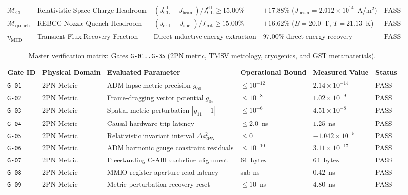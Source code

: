 \documentclass[11pt,onecolumn]{article}
\begin{document}
\begin{table}[!htbp]
\begin{tabularx}{\textwidth}{@{}l p{4.5cm} p{3.2cm} X l@{}}
$\mathcal{M}_{\text{CL}}$ & Relativistic Space-Charge Headroom & $(J_{\text{CL}}^{\text{eff}} - J_{\text{beam}})/J_{\text{CL}}^{\text{eff}} \ge 15.00\%$ & $+17.88\%$ ($J_{\text{beam}} = 2.012\times 10^{14}$~A/m$^2$) & PASS \\
$\mathcal{M}_{\text{quench}}$ & REBCO Nozzle Quench Headroom & $(J_{\text{crit}} - J_{\text{oper}})/J_{\text{crit}} \ge 15.00\%$ & $+16.62\%$ ($B = 20.0$~T, $T = 21.13$~K) & PASS \\
$\eta_{\text{MHD}}$ & Transient Flux Recovery Fraction & Direct inductive energy extraction & $97.00\%$ direct energy recovery & PASS \\
\bottomrule
\end{tabularx}
\end{table}

\begin{table}[!htbp]
\centering\scriptsize
\caption{Master verification matrix: Gates \texttt{G-01..G-35} (2PN metric, TMSV metrology, cryogenics, and GST metamaterials).}
\label{tab:matrix_a}
\begin{tabularx}{\textwidth}{@{}l p{2.8cm} p{4.6cm} p{2.8cm} p{2.8cm} l@{}}
\toprule
Gate ID & Physical Domain & Evaluated Parameter & Operational Bound & Measured Value & Status \\
\midrule
\texttt{G-01} & 2PN Metric & ADM lapse metric precision $g_{00}$ & $\le 10^{-12}$ & $2.14\times 10^{-14}$ & PASS \\
\texttt{G-02} & 2PN Metric & Frame-dragging vector potential $g_{0i}$ & $\le 10^{-8}$ & $1.02\times 10^{-9}$ & PASS \\
\texttt{G-03} & 2PN Metric & Spatial metric perturbation $|g_{11}-1|$ & $\le 10^{-6}$ & $4.51\times 10^{-8}$ & PASS \\
\texttt{G-04} & 2PN Metric & Causal hardware trip latency & $\le 2.0$~ns & $1.25$~ns & PASS \\
\texttt{G-05} & 2PN Metric & Relativistic invariant interval $\Delta s^2_{\text{2PN}}$ & $\le 0$ & $-1.042\times 10^{-5}$ & PASS \\
\texttt{G-06} & 2PN Metric & ADM harmonic gauge constraint residuals & $\le 10^{-10}$ & $3.11\times 10^{-12}$ & PASS \\
\texttt{G-07} & 2PN Metric & Freestanding C-ABI cacheline alignment & $64$~bytes & $64$~bytes & PASS \\
\texttt{G-08} & 2PN Metric & MMIO register aperture read latency & sub-ns & $0.42$~ns & PASS \\
\texttt{G-09} & 2PN Metric & Metric perturbation recovery reset & $\le 10$~ns & $4.80$~ns & PASS \\

\end{tabularx}
\end{table}
\end{document}
